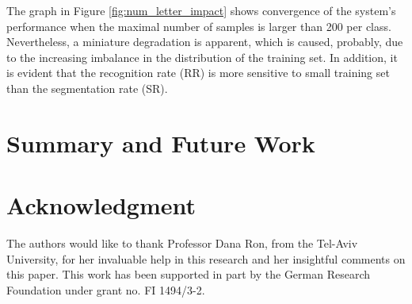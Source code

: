 \documentclass[10pt, conference, compsocconf]{IEEEtran}
\theoremstyle{definition}
\begin{document}
The graph in Figure \ref{fig:num_letter_impact} shows convergence of the system's performance when the maximal number of samples is larger than 200 per class. 
Nevertheless, a miniature degradation is apparent, which is caused, probably, due to the increasing imbalance in the distribution of the training set.
In addition, it is evident that the recognition rate (RR) is more sensitive to small training set than the segmentation rate (SR).

\section{Summary and Future Work}

\section*{Acknowledgment}
The authors would like to thank Professor Dana Ron, from the Tel-Aviv University, for her invaluable help in this research and her insightful comments on this paper. This work has been supported in part by the German Research Foundation under grant no. FI 1494/3-2.



\end{document}
